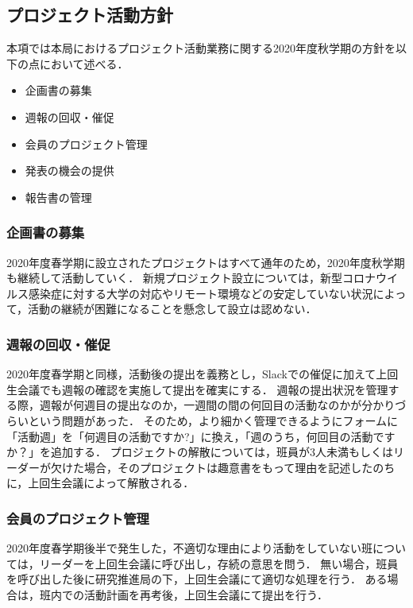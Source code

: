 \subsection*{プロジェクト活動方針}


本項では本局におけるプロジェクト活動業務に関する2020年度秋学期の方針を以下の点において述べる．

\begin{itemize}
\item 企画書の募集
\item 週報の回収・催促
\item 会員のプロジェクト管理
\item 発表の機会の提供
\item 報告書の管理
\end{itemize}

\subsubsection*{企画書の募集}

2020年度春学期に設立されたプロジェクトはすべて通年のため，2020年度秋学期も継続して活動していく．
新規プロジェクト設立については，新型コロナウイルス感染症に対する大学の対応やリモート環境などの安定していない状況によって，活動の継続が困難になることを懸念して設立は認めない．

\subsubsection*{週報の回収・催促}

2020年度春学期と同様，活動後の提出を義務とし，Slackでの催促に加えて上回生会議でも週報の確認を実施して提出を確実にする．
週報の提出状況を管理する際，週報が何週目の提出なのか，一週間の間の何回目の活動なのかが分かりづらいという問題があった．
そのため，より細かく管理できるようにフォームに「活動週」を「何週目の活動ですか?」に換え，「週のうち，何回目の活動ですか？」を追加する．
プロジェクトの解散については，班員が3人未満もしくはリーダーが欠けた場合，そのプロジェクトは趣意書をもって理由を記述したのちに，上回生会議によって解散される．

\subsubsection*{会員のプロジェクト管理}

2020年度春学期後半で発生した，不適切な理由により活動をしていない班については，リーダーを上回生会議に呼び出し，存続の意思を問う．
無い場合，班員を呼び出した後に研究推進局の下，上回生会議にて適切な処理を行う．
ある場合は，班内での活動計画を再考後，上回生会議にて提出を行う．

